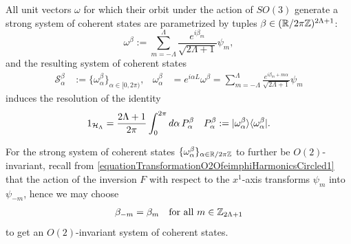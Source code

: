 \begin{proposition}
All unit vectors $\omega$ for which their orbit under the action of $SO(3)$ generate a strong system of coherent states are parametrized by tuples $\beta \in (\mathbb{R}/2\pi\mathbb{Z})^{2\Lambda + 1}$:
\begin{equation}
    \omega^\beta := \sum_{m = -\Lambda}^\Lambda \frac{e^{i \beta_m}}{\sqrt{2\Lambda + 1}} \psi_m,
\end{equation}
and the resulting system of coherent states
\begin{align}
    \mathcal S^\beta_\alpha &:= \{\omega_\alpha^\beta\}_{\alpha \in [0, 2\pi)}, & 
    \omega^\beta_\alpha &= e^{i\alpha L} \omega^\beta = \sum_{m = -\Lambda}^\Lambda \frac{e^{i \beta_m + m \alpha}}{\sqrt{2\Lambda + 1}} \psi_m
\end{align}
induces the resolution of the identity
\begin{align}
    1_{\mathcal H_\Lambda} &= \frac{2\Lambda + 1}{2\pi} \int_0^{2\pi} d\alpha \, P^\beta_\alpha &
    P_\alpha^\beta := |\omega^\beta_\alpha \rangle\langle \omega^\beta_\alpha|.
\end{align}
\end{proposition}

For the strong system of coherent states $\{\omega^\beta_\alpha\}_{\alpha \in \mathbb{R}/2\pi\mathbb{Z}}$ to further be $O(2)$-invariant, recall from  \eqref{equationTransformationO2OfeimphiHarmonicsCircled1} that the action of the inversion $F$ with respect to the $x^1$-axis transforms $\psi_m$ into $\psi_{-m}$, hence we may choose
\begin{align}\label{equationConditionBetasO2Invariant}
    \beta_{-m} &= \beta_m & \text{for all } m \in \mathbb{Z}_{2\Lambda + 1}
\end{align}
to get an $O(2)$-invariant system of coherent states.

